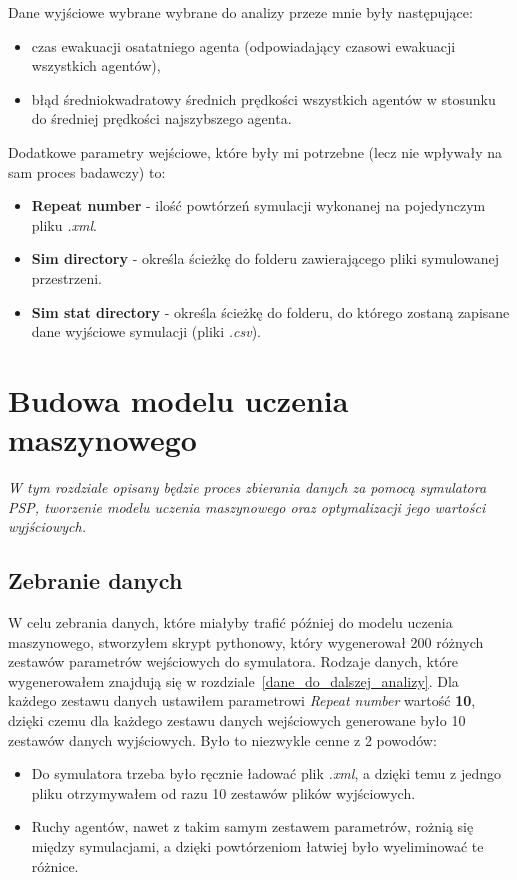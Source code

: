 \documentclass[12pt]{aghdpl}
\begin{document}
		Dane wyjściowe wybrane wybrane do analizy przeze mnie były następujące:
		
		\begin{itemize}
		\item czas ewakuacji osatatniego agenta (odpowiadający czasowi ewakuacji wszystkich agentów),
		\item błąd średniokwadratowy średnich prędkości wszystkich agentów w stosunku do średniej prędkości najszybszego agenta.
		\end{itemize}
		
		Dodatkowe parametry wejściowe, które były mi potrzebne (lecz nie wpływały na sam proces badawczy) to:
		\begin{itemize}
		\item \textbf{Repeat number} - ilość powtórzeń symulacji wykonanej na pojedynczym pliku \textit{.xml}.
		\item \textbf{Sim directory} - określa ścieżkę do folderu zawierającego pliki symulowanej przestrzeni.
		\item \textbf{Sim stat directory} - określa ścieżkę do folderu, do którego zostaną zapisane dane wyjściowe symulacji (pliki \textit{.csv}).
		\end{itemize}
		
	\chapter{Budowa modelu uczenia maszynowego}
	\textit{W tym rozdziale opisany będzie proces zbierania danych za pomocą symulatora PSP, tworzenie modelu uczenia maszynowego oraz optymalizacji jego wartości wyjściowych.}
	
		\section{Zebranie danych} \label{zebranie_danych}
		W celu zebrania danych, które miałyby trafić później do modelu uczenia maszynowego, stworzyłem skrypt pythonowy, który wygenerował 200 różnych zestawów parametrów wejściowych do symulatora. Rodzaje danych, które wygenerowałem znajdują się w rozdziale~\ref{dane_do_dalszej_analizy}. Dla każdego zestawu danych ustawiłem parametrowi \textit{Repeat number} wartość \textbf{10}, dzięki czemu dla każdego zestawu danych wejściowych generowane było 10 zestawów danych wyjściowych. Było to niezwykle cenne z 2 powodów:
		\begin{itemize}
		\item Do symulatora trzeba było ręcznie ładować plik \textit{.xml}, a dzięki temu z jedngo pliku otrzymywałem od razu 10 zestawów plików wyjściowych.
		\item Ruchy agentów, nawet z takim samym zestawem parametrów, rożnią się między symulacjami, a dzięki powtórzeniom łatwiej było wyeliminować te różnice.
		\end{itemize}
		
\end{document}

